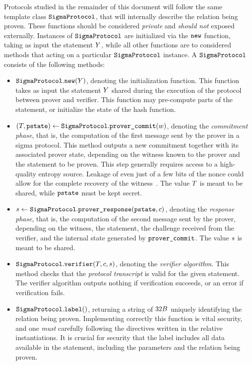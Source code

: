 \documentclass[11pt]{article}
\begin{document}
Protocols studied in the remainder of this document will follow the same template class $\texttt{SigmaProtocol}$, that will internally describe the relation being proven. These functions should be considered \emph{private} and \emph{should not} exposed externally.
Instances of $\texttt{SigmaProtocol}$ are initialized via the $\texttt{new}$ function, taking as input the statement $Y$, while all other functions are to considered methods that acting on a particular $\texttt{SigmaProtocol}$ instance.
A $\texttt{SigmaProtocol}$ consists of the following methods:
      \begin{itemize}
        \item $\texttt{SigmaProtocol}.\texttt{new}(Y)$,
        denoting the initialization function. This function takes as input the statement $Y$ shared during the execution of the protocol between prover and verifier.
        This function may pre-compute parts of the statement, or initialize the state of the hash function.
        \item
          $(T, \texttt{pstate})\gets \texttt{SigmaProtocol}.\texttt{prover\_commit}(w)$,
          denoting the \emph{commitment phase}, that is, the computation of the first message sent by the prover in a sigma protocol. This method outputs a new commitment together with its associated prover state, depending on the witness known to the prover and the statement to be proven.
          This step generally requires access to a high-quality entropy source.
          Leakage of even just of a few bits of the nonce could allow for the complete recovery of the witness~\cite{lattice-attack,bleichenbacher,CCS:ANTTY20}.
					The value $T$ is meant to be shared, while $\texttt{pstate}$ must be kept secret.
        \item
          $s \gets \texttt{SigmaProtocol}.\texttt{prover\_response}(\texttt{pstate}, c)$,
          denoting the \emph{response phase}, that is, the computation of the second message sent by the prover, depending on the witness, the statement, the challenge received from the verifier, and the internal state generated by $\texttt{prover\_commit}$.
          The value $s$ is meant to be shared.
        \item $\texttt{SigmaProtocol}.\texttt{verifier}(T, c, s)$,
          denoting the \emph{verifier algorithm}. This method checks that
          the \emph{protocol transcript} is valid for the given statement.
          The verifier algorithm outputs nothing if verification succeeds,
          or an error if verification fails.
          \item $\texttt{SigmaProtocol}.\texttt{label}()$,
          returning a string of $32B$ uniquely identifying the relation being proven.
          Implementing correctly this function is vital security, and one \emph{must} carefully following the directives written in the relative instantiations. It is crucial for security that the label includes all data available in the statement, including the parameters and the relation being proven.


\end{itemize}
\end{document}
